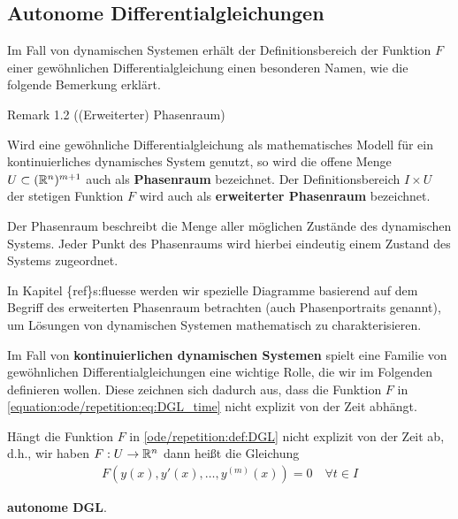 \subsection{Autonome Differentialgleichungen}
\label{\detokenize{ode/repetition:autonome-differentialgleichungen}}
\par
Im Fall von dynamischen Systemen erhält der Definitionsbereich der Funktion \(F\) einer gewöhnlichen Differentialgleichung einen besonderen Namen, wie die folgende Bemerkung erklärt.
\label{ode/repetition:remark-2}
\begin{emphBox}{}{}{Remark 1.2 ((Erweiterter) Phasenraum)}



\par
Wird eine gewöhnliche Differentialgleichung als mathematisches Modell für ein kontinuierliches dynamisches System genutzt, so wird die offene Menge \(U\subset (\mathbb{R}^n)^{m+1}\) auch als \textbf{Phasenraum} bezeichnet.
Der Definitionsbereich \(I\times U\) der stetigen Funktion \(F\) wird auch als \textbf{erweiterter Phasenraum} bezeichnet.

\par
Der Phasenraum beschreibt die Menge aller möglichen Zustände des dynamischen Systems.
Jeder Punkt des Phasenraums wird hierbei eindeutig einem Zustand des Systems zugeordnet.

\par
In Kapitel \{ref\}s:fluesse werden wir spezielle Diagramme basierend auf dem Begriff des erweiterten Phasenraum betrachten (auch Phasenportraits genannt), um Lösungen von dynamischen Systemen mathematisch zu charakterisieren.
\end{emphBox}

\par
Im Fall von \textbf{kontinuierlichen dynamischen Systemen} spielt eine Familie von gewöhnlichen Differentialgleichungen eine wichtige Rolle, die wir im Folgenden definieren wollen.
Diese zeichnen sich dadurch aus, dass die Funktion \(F\) in \eqref{equation:ode/repetition:eq:DGL_time} nicht explizit von der Zeit abhängt.
\label{ode/repetition:definition-3}
\begin{definition}{}{}



\par
Hängt die Funktion \(F\) in \cref{ode/repetition:def:DGL} nicht explizit von der Zeit ab, d.h., wir haben \(F:U\rightarrow\mathbb{R}^n\) dann heißt die Gleichung
\begin{align}\label{equation:ode/repetition:eq:autonome_DGL}
F(y(x), y'(x), \ldots, y^{(m)}(x)) = 0 \quad \forall t\in I
\end{align}
\par
\textbf{autonome DGL}.
\end{definition}

